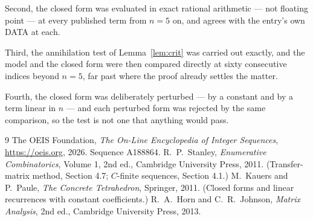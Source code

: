 \documentclass[11pt,a4paper]{article}
\theoremstyle{plain}
\theoremstyle{definition}
\begin{document}
Second, the closed form was evaluated in exact rational arithmetic --- not floating point ---
at every published term from $n=5$ on, and agrees with the entry's own DATA at each.

Third, the annihilation test of Lemma~\ref{lem:crit} was carried out exactly, and the model
and the closed form were then compared directly at sixty consecutive indices beyond
$n=5$, far past where the proof already settles the matter.

Fourth, the closed form was deliberately perturbed --- by a constant and by a term linear in
$n$ --- and each perturbed form was rejected by the same comparison, so the test is not one
that anything would pass.

\begin{thebibliography}{9}
 The OEIS Foundation, \emph{The On-Line Encyclopedia of Integer
Sequences}, \url{https://oeis.org}, 2026. Sequence A188864.
 R.~P.~Stanley, \emph{Enumerative Combinatorics}, Volume 1, 2nd ed.,
Cambridge University Press, 2011. (Transfer-matrix method, Section 4.7; $C$-finite sequences,
Section 4.1.)
 M.~Kauers and P.~Paule, \emph{The Concrete Tetrahedron}, Springer, 2011.
(Closed forms and linear recurrences with constant coefficients.)
 R.~A.~Horn and C.~R.~Johnson, \emph{Matrix Analysis}, 2nd ed., Cambridge
University Press, 2013.
\end{thebibliography}
\end{document}
